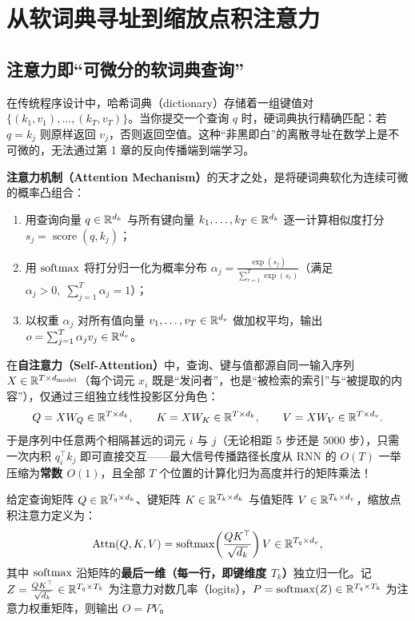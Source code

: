 \section{从软词典寻址到缩放点积注意力}
\label{sec:sdpa}

\subsection{注意力即“可微分的软词典查询”}

在传统程序设计中，哈希词典（dictionary）存储着一组键值对 $\{(k_1, v_1), \dots, (k_T, v_T)\}$。当你提交一个查询 $q$ 时，硬词典执行精确匹配：若 $q = k_j$ 则原样返回 $v_j$，否则返回空值。这种“非黑即白”的离散寻址在数学上是不可微的，无法通过第 1 章的反向传播端到端学习。

\textbf{注意力机制（Attention Mechanism）}的天才之处，是将硬词典软化为连续可微的概率凸组合：
\begin{enumerate}
  \item 用查询向量 $q \in \mathbb{R}^{d_k}$ 与所有键向量 $k_1, \dots, k_T \in \mathbb{R}^{d_k}$ 逐一计算相似度打分 $s_j = \operatorname{score}(q, k_j)$；
  \item 用 $\operatorname{softmax}$ 将打分归一化为概率分布 $\alpha_j = \frac{\exp(s_j)}{\sum_{r=1}^T \exp(s_r)}$（满足 $\alpha_j > 0,\; \sum_{j=1}^T \alpha_j = 1$）；
  \item 以权重 $\alpha_j$ 对所有值向量 $v_1, \dots, v_T \in \mathbb{R}^{d_v}$ 做加权平均，输出 $o = \sum_{j=1}^T \alpha_j v_j \in \mathbb{R}^{d_v}$。
\end{enumerate}

在\textbf{自注意力（Self-Attention）}中，查询、键与值都源自同一输入序列 $X \in \mathbb{R}^{T \times d_{\text{model}}}$（每个词元 $x_i$ 既是“发问者”，也是“被检索的索引”与“被提取的内容”），仅通过三组独立线性投影区分角色：
\begin{equation}
  Q = X W_Q \in \mathbb{R}^{T \times d_k}, \qquad
  K = X W_K \in \mathbb{R}^{T \times d_k}, \qquad
  V = X W_V \in \mathbb{R}^{T \times d_v}.
  \label{eq:qkv-proj}
\end{equation}
于是序列中任意两个相隔甚远的词元 $i$ 与 $j$（无论相距 $5$ 步还是 $5000$ 步），只需一次内积 $q_i^\top k_j$ 即可直接交互——最大信号传播路径长度从 RNN 的 $O(T)$ 一举压缩为\textbf{常数 $O(1)$}，且全部 $T$ 个位置的计算化归为高度并行的矩阵乘法！

\begin{defBox}
\begin{definition}
给定查询矩阵 $Q \in \mathbb{R}^{T_q \times d_k}$、键矩阵 $K \in \mathbb{R}^{T_k \times d_k}$ 与值矩阵 $V \in \mathbb{R}^{T_k \times d_v}$，缩放点积注意力定义为：
\begin{equation}
  \operatorname{Attn}(Q, K, V) = \operatorname{softmax}\!\left(\frac{Q K^\top}{\sqrt{d_k}}\right) V \in \mathbb{R}^{T_q \times d_v},
  \label{eq:sdpa}
\end{equation}
其中 $\operatorname{softmax}$ 沿矩阵的\textbf{最后一维（每一行，即键维度 $T_k$）}独立归一化。记 $Z = \frac{Q K^\top}{\sqrt{d_k}} \in \mathbb{R}^{T_q \times T_k}$ 为注意力对数几率（logits），$P = \operatorname{softmax}(Z) \in \mathbb{R}^{T_q \times T_k}$ 为注意力权重矩阵，则输出 $O = P V$。
\end{definition}
\end{defBox}

